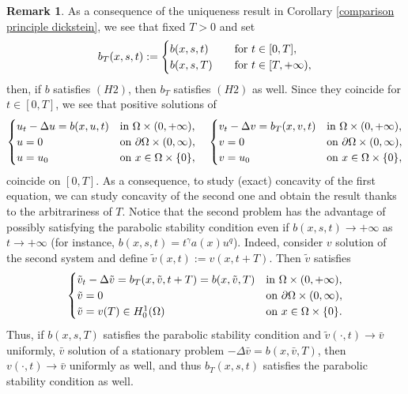 \documentclass[11pt, reqno]{amsart}
\theoremstyle{definition}
\newtheorem{remark}[lemma]{Remark}
\numberwithin{equation}{section}
\begin{document}
\begin{remark}\label{rem_troncamento}
As a consequence of the uniqueness result in Corollary \ref{comparison principle dickstein}, we see that fixed $T>0$ and set 
$$b_T(x,s,t):=
\begin{cases}
b(x,s,t) & \quad \hbox{for $t \in [0,T]$}, \\
b(x,s,T) & \quad \hbox{for $t \in [T,+\infty)$},
\end{cases}
$$
then, if $b$ satisfies \hyperlink{H2}{\( (H2) \)}, then $b_T$ satisfies \hyperlink{H2}{\( (H2) \)} as well. Since they coincide for $t \in [0,T]$, we see that positive solutions of
$$
\begin{cases}
u_t-\Delta u = b(x,u,t)&\hbox{in }\Omega\times(0,+\infty),\\
u=0 &\hbox{on } \partial \Omega\times(0,\infty),\\
u=u_0&\hbox{on } x\in \Omega \times \{0\},
\end{cases}
\quad
\begin{cases}
v_t-\Delta v = b_T(x,v,t)&\hbox{in }\Omega\times(0,+\infty),\\
v=0 &\hbox{on } \partial \Omega\times(0,\infty),\\
v=u_0&\hbox{on } x\in \Omega \times \{0\},
\end{cases}
$$
coincide on $[0,T]$. As a consequence, to study (exact) concavity of the first equation, we can study concavity of the second one and obtain the result thanks to the arbitrariness of $T$. 
Notice that the second problem has the advantage of possibly satisfying the parabolic stability condition even if $b(x,s,t) \to +\infty$ as $t\to +\infty$ (for instance, $b(x,s,t)=t^{\gamma} a(x) u^q$). 
Indeed, consider $v$ solution of the second system and define $\tilde{v}(x,t):=v(x,t+T)$. Then $\tilde{v}$ satisfies
$$	
\begin{cases}
\tilde{v}_t-\Delta \tilde{v} = b_T(x,\tilde{v},t+T) = b(x, \tilde{v}, T) &\hbox{in }\Omega\times(0,+\infty),\\
\tilde{v}=0 &\hbox{on } \partial \Omega\times(0,\infty),\\
\tilde{v}=v(T) \in H^1_0(\Omega) &\hbox{on } x\in \Omega \times \{0\}.
\end{cases}
$$
Thus, if $b(x,s,T)$ satisfies the parabolic stability condition and $\tilde{v}(\cdot, t) \to \bar{v}$ uniformly, $\bar{v}$ solution of a stationary problem $-\Delta \bar{v} = b(x,\bar{v}, T)$, then $v(\cdot,t)\to \bar{v}$ uniformly as well, and thus $b_T(x,s,t)$ satisfies the parabolic stability condition as well. 
\end{remark}
\end{document}
